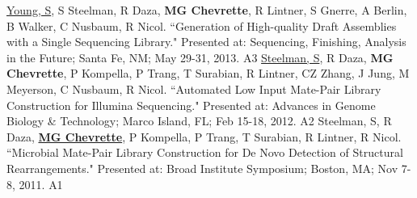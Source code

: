\begin{cvpubs}
  \cvpub
    {\underline{Young, S}, S Steelman, R Daza, \textbf{MG Chevrette}, R Lintner, S Gnerre, A Berlin, B Walker, C Nusbaum, R Nicol. ``Generation of High-quality Draft Assemblies with a Single Sequencing Library." Presented at: Sequencing, Finishing, Analysis in the Future; Santa Fe, NM; May 29-31, 2013.} %
    {A3} %
  \cvpub
    {\underline{Steelman, S}, R Daza, \textbf{MG Chevrette}, P Kompella, P Trang, T Surabian, R Lintner, CZ Zhang, J Jung, M Meyerson, C Nusbaum, R Nicol. ``Automated Low Input Mate-Pair Library Construction for Illumina Sequencing." Presented at: Advances in Genome Biology \& Technology; Marco Island, FL; Feb 15-18, 2012.} %
    {A2} %
  \cvpub
    {Steelman, S, R Daza, \underline{\textbf{MG Chevrette}}, P Kompella, P Trang, T Surabian, R Lintner, R Nicol. ``Microbial Mate-Pair Library Construction for De Novo Detection of Structural Rearrangements." Presented at: Broad Institute Symposium; Boston, MA; Nov 7-8, 2011.} %
    {A1} %
\end{cvpubs}